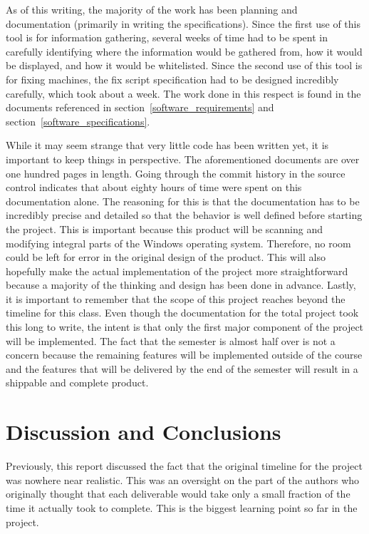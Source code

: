 \documentclass[letterpaper,12pt]{article}
\begin{document}
As of this writing, the majority of the work has been planning and documentation
(primarily in writing the specifications).  Since the first use of this tool is
for information gathering, several weeks of time had to be spent in carefully
identifying where the information would be gathered from, how it would be
displayed, and how it would be whitelisted.  Since the second use of this tool
is for fixing machines, the fix script specification had to be designed
incredibly carefully, which took about a week.  The work done in this respect is
found in the documents referenced in section~\ref{software_requirements} and
section~\ref{software_specifications}.  

While it may seem strange that very little code has been written yet, it is
important to keep things in perspective.  The aforementioned documents are over
one hundred pages in length.  Going through the commit history in the source
control indicates that about eighty hours of time were spent on this
documentation alone.  The reasoning for this is that the documentation has to be
incredibly precise and detailed so that the behavior is well defined before
starting the project.  This is important because this product will be scanning
and modifying integral parts of the Windows operating system.  Therefore, no
room could be left for error in the original design of the product.  This will
also hopefully make the actual implementation of the project more
straightforward because a majority of the thinking and design has been done in
advance.  Lastly, it is important to remember that the scope of this project
reaches beyond the timeline for this class.  Even though the documentation for
the total project took this long to write, the intent is that only the first
major component of the project will be implemented.  The fact that the semester
is almost half over is not a concern because the remaining features will be
implemented outside of the course and the features that will be delivered by the
end of the semester will result in a shippable and complete product.  

\newpage



\section{Discussion and Conclusions} \label{discussion}
Previously, this report discussed the fact that the original timeline for the
project was nowhere near realistic.  This was an oversight on the part of the
authors who originally thought that each deliverable would take only a small
fraction of the time it actually took to complete.  This is the biggest learning
point so far in the project.  
\end{document}
